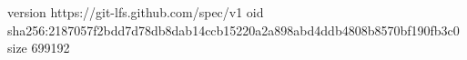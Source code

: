version https://git-lfs.github.com/spec/v1
oid sha256:2187057f2bdd7d78db8dab14ccb15220a2a898abd4ddb4808b8570bf190fb3c0
size 699192
